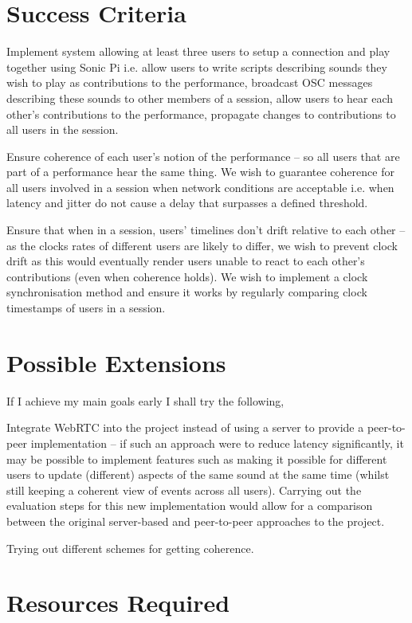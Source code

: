 \documentclass[12pt,a4paper,twoside]{article}
\begin{document}
\section*{Success Criteria}

Implement system allowing at least three users to setup a connection and play together using Sonic Pi i.e. allow users to write scripts describing sounds they wish to play as contributions to the performance, broadcast OSC messages describing these sounds to other members of a session, allow users to hear each other's contributions to the performance, propagate changes to contributions to all users in the session.

Ensure coherence of each user's notion of the performance -- so all users that are part of a performance hear the same thing. We wish to guarantee coherence for all users involved in a session when network conditions are acceptable i.e. when latency and jitter do not cause a delay that surpasses a defined threshold.

Ensure that when in a session, users' timelines don't drift relative to each other -- as the clocks rates of different users are likely to differ, we wish to prevent clock drift as this would eventually render users unable to react to each other's contributions (even when coherence holds). We wish to implement a clock synchronisation method and ensure it works by regularly comparing clock timestamps of users in a session.


\section*{Possible Extensions}

If I achieve my main goals early I shall try the following,

Integrate WebRTC into the project instead of using a server to provide a peer-to-peer implementation -- if such an approach were to reduce latency significantly, it may be possible to implement features such as making it possible for different users to update (different) aspects of the same sound at the same time (whilst still keeping a coherent view of events across all users).
Carrying out the evaluation steps for this new implementation would allow for a comparison between the original server-based and peer-to-peer approaches to the project.

Trying out different schemes for getting coherence.

\section*{Resources Required}
\end{document}
